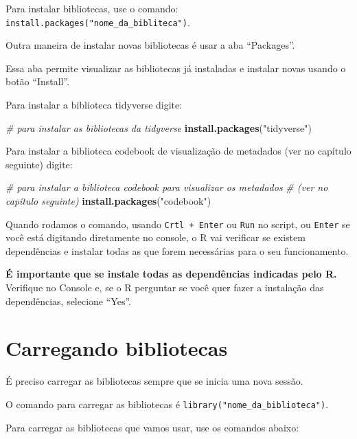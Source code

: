 \documentclass[
  10pt,
  brazil,
  a4paper,
  twoside, notitlepage, openright]{book}
\newenvironment{Shaded}{\begin{snugshade}}{\end{snugshade}}
\newcommand{\CommentTok}[1]{\textcolor[rgb]{0.56,0.35,0.01}{\textit{#1}}}
\newcommand{\KeywordTok}[1]{\textcolor[rgb]{0.13,0.29,0.53}{\textbf{#1}}}
\newcommand{\NormalTok}[1]{#1}
\newcommand{\StringTok}[1]{\textcolor[rgb]{0.31,0.60,0.02}{#1}}
\begin{document}
Para instalar bibliotecas, use o comando: \texttt{install.packages("nome\_da\_bibliteca")}.

Outra maneira de instalar novas bibliotecas é usar a aba ``Packages''.

Essa aba permite visualizar as bibliotecas já instaladas e instalar novas usando o botão ``Install''.

Para instalar a biblioteca tidyverse digite:

\begin{Shaded}
\begin{Highlighting}[]
\CommentTok{# para instalar as bibliotecas da tidyverse}
\KeywordTok{install.packages}\NormalTok{(}\StringTok{"tidyverse"}\NormalTok{)}
\end{Highlighting}
\end{Shaded}

Para instalar a biblioteca codebook de visualização de metadados (ver no capítulo seguinte) digite:

\begin{Shaded}
\begin{Highlighting}[]
\CommentTok{# para instalar a biblioteca codebook para visualizar os metadados }
\CommentTok{# (ver no capítulo seguinte)}
\KeywordTok{install.packages}\NormalTok{(}\StringTok{"codebook"}\NormalTok{)}
\end{Highlighting}
\end{Shaded}

Quando rodamos o comando, usando \texttt{Crtl\ +\ Enter} ou \texttt{Run} no script, ou \texttt{Enter} se você está digitando diretamente no console, o R vai verificar se existem dependências e instalar todas as que forem necessárias para o seu funcionamento.

\textbf{É importante que se instale todas as dependências indicadas pelo R.} Verifique no Console e, se o R perguntar se você quer fazer a instalação das dependências, selecione ``Yes''.

\hypertarget{carregando-bibliotecas}{%
\section{Carregando bibliotecas}\label{carregando-bibliotecas}}

É preciso carregar as bibliotecas sempre que se inicia uma nova sessão.

O comando para carregar as bibliotecas é \texttt{library("nome\_da\_biblioteca")}.

Para carregar as bibliotecas que vamos usar, use os comandos abaixo:
\end{document}
